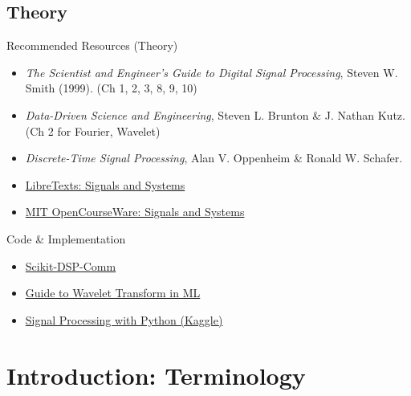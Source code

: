 \documentclass[aspectratio=169]{beamer}
\begin{document}
\subsection{Theory}
\begin{frame}{Recommended Resources (Theory)}
\begin{itemize}
    \item \textit{The Scientist and Engineer's Guide to Digital Signal Processing}, Steven W. Smith (1999). (Ch 1, 2, 3, 8, 9, 10)
    \item \textit{Data-Driven Science and Engineering}, Steven L. Brunton \& J. Nathan Kutz. (Ch 2 for Fourier, Wavelet)
    \item \textit{Discrete-Time Signal Processing}, Alan V. Oppenheim \& Ronald W. Schafer.
    \item \href{https://eng.libretexts.org/Bookshelves/Electrical_Engineering/Signal_Processing_and_Modeling/Signals_and_Systems_(Baraniuk_et_al.)}{LibreTexts: Signals and Systems}
    \item \href{https://ocw.mit.edu/courses/6-003-signals-and-systems-fall-2011/}{MIT OpenCourseWare: Signals and Systems}
\end{itemize}

Code \& Implementation

\begin{itemize}
    \item \href{https://mwickert.github.io/scikit-dsp-comm/}{Scikit-DSP-Comm}
    \item \href{https://ataspinar.com/2018/12/21/a-guide-for-using-the-wavelet-transform-in-machine-learning/}{Guide to Wavelet Transform in ML}
    \item \href{https://www.kaggle.com/code/faressayah/signal-processing-with-python}{Signal Processing with Python (Kaggle)}
\end{itemize}
\end{frame}


\section{Introduction: Terminology}
\end{document}
